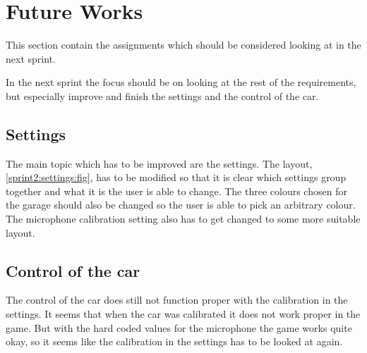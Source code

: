 \section{Future Works}
This section contain the assignments which should be considered looking at in the next sprint.

In the next sprint the focus should be on looking at the rest of the requirements, but especially improve and finish the settings and the control of the car.

\subsection{Settings}
The main topic which has to be improved are the settings.
The layout, \cref{sprint2:settings:fig}, has to be modified so that it is clear which settings group together and what it is the user is able to change.
The three colours chosen for the garage should also be changed so the user is able to pick an arbitrary colour.
The microphone calibration setting also has to get changed to some more suitable layout.

\subsection{Control of the car}\label{sprint2:eval:control_car}
The control of the car does still not function proper with the calibration in the settings.
It seems that when the car was calibrated it does not work proper in the game.
But with the hard coded values for the microphone the game works quite okay, so it seems like the calibration in the settings has to be looked at again.